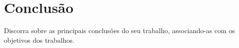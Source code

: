 \section{Conclusão}

Discorra sobre as principais conclusões do seu trabalho, associando-as com os objetivos dos trabalhos.
